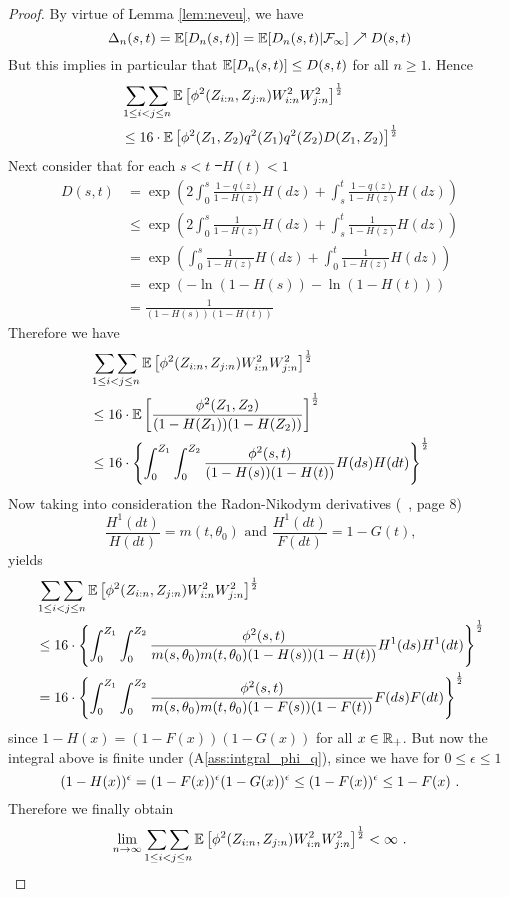 \begin{lemma}
\begin{proof}
		By virtue of Lemma \ref{lem:neveu}, we have
		$$\Delta_{n}(s,t) = \mathbb{E}[D_n(s,t)] = \mathbb{E}[D_n(s,t)|\mathcal{F}_\infty] \nearrow D(s,t)$$
		But this implies in particular that $\mathbb{E}[D_n(s,t)] \leq D(s,t)$ for all $n\geq 1$. Hence 
		\begin{align*}
		&\mathop{\sum\sum}\limits_{1\leq i<j\leq n}\mathbb{E}\left[\phi^2(Z_{i:n}, Z_{j:n}) W^2_{i:n} W^2_{j:n}\right]^{\frac{1}{2}}\\
		&\leq 16\cdot\mathbb{E}\left[\phi^2(Z_{1}, Z_{2}) q^2(Z_{1})q^2(Z_{2})D(Z_1,Z_2)\right]^{\frac{1}{2}}
		\end{align*}		
		Next consider that for each $s<t$ \st\ $H(t)<1$
		\begin{align*}
		D(s,t) &= \exp\left(2\int_{0}^{s} \frac{1-q(z)}{1-H(z)} H(dz) + \int_{s}^{t} \frac{1-q(z)}{1-H(z)} H(dz)\right)\\
		&\leq \exp\left(2\int_{0}^{s} \frac{1}{1-H(z)} H(dz) + \int_{s}^{t} \frac{1}{1-H(z)} H(dz)\right)\\
		&= \exp\left(\int_{0}^{s} \frac{1}{1-H(z)} H(dz) + \int_{0}^{t} \frac{1}{1-H(z)} H(dz)\right)\\
		&= \exp\left(-\ln(1-H(s)) -\ln(1-H(t))\right)\\
		&= \frac{1}{(1-H(s))(1-H(t))}
		\end{align*}
		Therefore we have
		\begin{align*}
		&\mathop{\sum\sum}\limits_{1\leq i<j\leq n}\mathbb{E}\left[\phi^2(Z_{i:n}, Z_{j:n}) W^2_{i:n} W^2_{j:n}\right]^{\frac{1}{2}}\\
		&\leq 16\cdot\mathbb{E}\left[\frac{\phi^2(Z_{1}, Z_{2})}{(1-H(Z_1))(1-H(Z_2))}\right]^{\frac{1}{2}}\\
		&\leq 16\cdot\left\{\int_{0}^{Z_1} \int_{0}^{Z_2}\frac{\phi^2(s, t)}{(1-H(s))(1-H(t))} H(ds)H(dt)\right\}^{\frac{1}{2}}
		\end{align*}		
		Now taking into consideration the Radon-Nikodym derivatives (\cf\ \cite{dikta2000strong}, page 8)
		$$\frac{H^1(dt)}{H(dt)} = m(t,\theta_0) \textrm{ and } \frac{H^1(dt)}{F(dt)} = 1-G(t) \textrm{,}$$
		yields
		\begin{align*}
		&\mathop{\sum\sum}\limits_{1\leq i<j\leq n}\mathbb{E}\left[\phi^2(Z_{i:n}, Z_{j:n}) W^2_{i:n} W^2_{j:n}\right]^{\frac{1}{2}}\\
		&\leq 16\cdot\left\{\int_{0}^{Z_1} \int_{0}^{Z_2}\frac{\phi^2(s, t)}{m(s,\theta_0)m(t, \theta_0)(1-H(s))(1-H(t))} H^1(ds)H^1(dt)\right\}^{\frac{1}{2}}\\
		&= 16\cdot\left\{\int_{0}^{Z_1} \int_{0}^{Z_2}\frac{\phi^2(s, t)}{m(s,\theta_0)m(t, \theta_0)(1-F(s))(1-F(t))} F(ds)F(dt)\right\}^{\frac{1}{2}}
		\end{align*}	
		since $1-H(x) = (1-F(x))(1-G(x))$ for all $x\in \mathbb{R}_+$. But now the integral above is finite under (A\ref{ass:intgral_phi_q}), since we have for $0\leq \epsilon\leq 1$
		$$(1-H(x))^\epsilon = (1-F(x))^\epsilon(1-G(x))^\epsilon \leq (1-F(x))^\epsilon \leq 1-F(x) \textrm{ .}$$
		Therefore we finally obtain
		$$\lim\limits_{n\to\infty}\mathop{\sum\sum}\limits_{1\leq i<j\leq n}\mathbb{E}\left[\phi^2(Z_{i:n}, Z_{j:n}) W^2_{i:n} W^2_{j:n}\right]^{\frac{1}{2}} < \infty\textrm{ .}$$
	\end{proof}
\end{lemma}	
